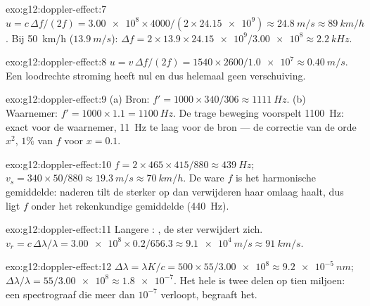 \begin{solution}{exo:g12:doppler-effect:7}
$u = c\,\Delta f/(2f) = \num{3.00e8} \times 4000/(2 \times \num{24.15e9})
\approx \qty{24.8}{m/s} \approx \qty{89}{km/h}$. Bij \qty{50}{km/h}
($\qty{13.9}{m/s}$): $\Delta f = 2 \times 13.9 \times
\num{24.15e9}/\num{3.00e8} \approx \qty{2.2}{kHz}$.
\end{solution}

\begin{solution}{exo:g12:doppler-effect:8}
$u = v\,\Delta f/(2f) = 1540 \times 2600/\num{1.0e7} \approx
\qty{0.40}{m/s}$. Een loodrechte stroming heeft  nul en
dus helemaal geen verschuiving.
\end{solution}

\begin{solution}{exo:g12:doppler-effect:9}
(a) Bron: $f' = 1000 \times 340/306 \approx \qty{1111}{Hz}$.
(b) Waarnemer: $f' = 1000 \times 1.1 = \qty{1100}{Hz}$. De trage
beweging voorspelt \qty{1100}{Hz}: exact voor de waarnemer, \qty{11}{Hz}
te laag voor de bron --- de correctie van de orde $x^2$, $1\%$ van $f$
voor $x = 0.1$.
\end{solution}

\begin{solution}{exo:g12:doppler-effect:10}
$f = 2 \times 465 \times 415/880 \approx \qty{439}{Hz}$;
$v_s = 340 \times 50/880 \approx \qty{19.3}{m/s} \approx \qty{70}{km/h}$.
De ware $f$ is het harmonische gemiddelde: naderen tilt de 
sterker op dan verwijderen haar omlaag haalt, dus ligt $f$ onder het
rekenkundige gemiddelde (\qty{440}{Hz}).
\end{solution}

\begin{solution}{exo:g12:doppler-effect:11}
Langere : , de ster verwijdert zich.
$v_r = c\,\Delta\lambda/\lambda = \num{3.00e8} \times 0.2/656.3 \approx
\qty{9.1e4}{m/s} \approx \qty{91}{km/s}$.
\end{solution}

\begin{solution}{exo:g12:doppler-effect:12}
$\Delta\lambda = \lambda K/c = 500 \times 55/\num{3.00e8} \approx
\qty{9.2e-5}{nm}$; $\Delta\lambda/\lambda = 55/\num{3.00e8} \approx
\num{1.8e-7}$. Het hele  is twee delen op tien miljoen: een
spectrograaf die meer dan $10^{-7}$ verloopt, begraaft het.
\end{solution}

